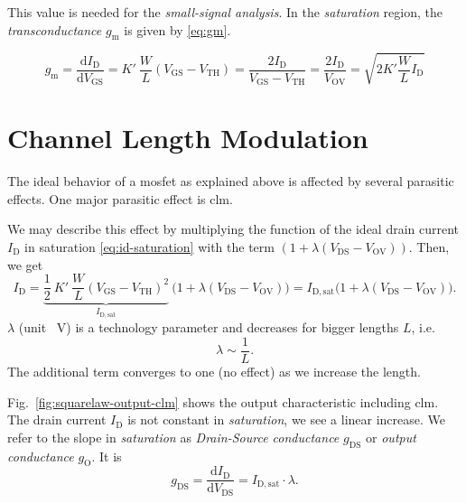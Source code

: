 \documentclass{article}[11pt]
\begin{document}
This value is needed for the \textit{small-signal analysis}.
In the \textit{saturation} region, the 
\textit{transconductance} $g_{\mathrm{m}}$ is given by \eqref{eq:gm}.

\begin{equation}\label{eq:gm}
g_{\mathrm{m}} = \frac{\mathrm{d} I_{\mathrm{D}}}{\mathrm{d} V_{\mathrm{GS}}} 
               = K' \ \frac{W}{L} (V_{\mathrm{GS}}-V_{\mathrm{TH}}) 
               = \frac{2 I_{\mathrm{D}}}{V_{\mathrm{GS}}-V_{\mathrm{TH}}}  
               = \frac{2 I_{\mathrm{D}}}{V_{\mathrm{OV}}}
               = \sqrt{2 K' \frac{W}{L} I_{\mathrm{D}}}
\end{equation}

\section{Channel Length Modulation}\label{sec:clm}

The ideal behavior of a \gls{mosfet} as explained above is affected by
several parasitic effects.
One major parasitic effect is \gls{clm}.

\medskip

We may describe this effect by multiplying the function of the ideal drain
current $I_{\mathrm{D}}$ in saturation \eqref{eq:id-saturation} with the term 
$ \left(1 + \lambda \left(V_{\mathrm{DS}}-V_{\mathrm{OV}}\right)\right)$.
Then, we get
\begin{equation}
 I_{\mathrm{D}} 
 = \underbrace{\frac{1}{2} \ K' \ \frac{W}{L} (V_{\mathrm{GS}}-V_{\mathrm{TH}})^2}_{I_{\mathrm{D,sat}}} \ 
  \big(1 + \lambda \left(V_{\mathrm{DS}}-V_{\mathrm{OV}}\right)\big)
 = I_{\mathrm{D,sat}} \big(1 + \lambda \left(V_{\mathrm{DS}}-V_{\mathrm{OV}}\right)\big).
\end{equation}
$\lambda$ (unit \si{\per\volt}) is a technology parameter and decreases for 
bigger lengths $L$, i.e.
\begin{equation}
\lambda \sim \frac{1}{L}.
\end{equation}
The additional term converges to one (no effect) as we increase the
length.

\medskip

Fig.~\ref{fig:squarelaw-output-clm} shows the output characteristic 
including \gls{clm}.
The drain current $I_{\mathrm{D}}$ is not constant in \textit{saturation},
we see a linear increase.
We refer to the slope in \textit{saturation} as 
\textit{Drain-Source conductance} $g_{\mathrm{DS}}$ or 
\textit{output conductance} $g_{\mathrm{O}}$.
It is
\begin{equation}\label{eq:gds}
g_{\mathrm{DS}} = \frac{\mathrm{d} I_{\mathrm{D}}}{\mathrm{d} V_{\mathrm{DS}}} 
                = I_{\mathrm{D,sat}} \cdot \lambda.
\end{equation}
\end{document}

